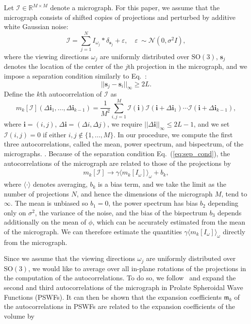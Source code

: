 \documentclass[english,11pt]{article}
\newcommand{\1}{\mathbf{1}}
\newcommand{\II}{\mathcal{I}}
\newcommand{\RR}{\mathbb{R}}
\newcommand{\mb}{\mathbf}
\newcommand{\TODO}[1]{{\color{red}{[#1]}}}
\numberwithin{equation}{section}
\theoremstyle{plain}
\theoremstyle{definition}
\theoremstyle{remark}
\theoremstyle{plain}
\theoremstyle{remark}
\theoremstyle{plain}
\theoremstyle{plain}
\newcommand{\be}{\begin{equation}}
\newcommand{\ee}{\end{equation}}
\begin{document}
Let $\II\in\RR^{M\times M}$ denote a micrograph. For this paper, we assume that the micrograph consists of shifted copies of projections and perturbed by additive white Gaussian noise:
\begin{equation}\label{eq:micrograph_model}
\II = \sum_{j=1}^{N} I_{\omega_j}\ast\delta_{\mb s_j}+ \varepsilon, \quad \varepsilon~\sim\mathcal{N}(0,\sigma^2 I),
\end{equation}
where the viewing directions $\omega_j$ are uniformly distributed over $\text{SO}(3)$, $\mb s_j$ denotes the location of the center of the $j$th projection in the micrograph, and we impose a separation condition similarly to Eq.~\TODO{2D}:
\be\label{eq:sep_cond} ||\mb s_j - \mb s_i||_{\infty} \geq 2L. \ee
\TODO{Say something about nonuniformity in practice? Remember that biologists will jump at this...}
Define the $k$th autocorrelation of $\II$ as
\be\label{eq:Kth_autocorrelation} 
m_k[\II](\Delta \mb i_1,\ldots, \Delta \mb i_{k-1}) = \frac{1}{M^2}\sum_{i,j = 1}^M\II(\mb i)\II(\mb i+\Delta\mb i_1)\cdots \II(\mb i+\Delta \mb i_{k-1}),
\ee
where $\mb i = (i,j)$, $\Delta \mb i = (\Delta i, \Delta j)$, we require $||\Delta\mb i||_{\infty}\leq 2L-1$, and we set $\II(i,j)=0$ if either $i,j\notin\{1,\ldots, M\}$. In our procedure, we compute the first three autocorrelations, called the mean, power spectrum, and bispectrum, of the micrographs. \TODO{This definition and terminology should come earlier}. Because of the separation condition Eq.~(\ref{eq:sep_cond}), the autocorrelations of the micrograph are related to those of the projections by 
\begin{align}
m_k[\II]  \to \gamma\langle m_k[I_\omega]\rangle_{\omega} + b_k, 
\end{align}
where $\langle\cdot\rangle$ denotes averaging, $b_k$ is a bias term, and we take the limit as the number of projections $N$, and hence the dimensions of the micrograph $M$, tend to $\infty$. The mean is unbiased so $b_1 = 0$, the power spectrum has bias $b_2$ depending only on $\sigma^2$, the variance of the noise, and the bias of the bispectrum $b_3$ depends additionally on the mean of $\phi$, which can be accurately estimated from the mean of the micrograph. We can therefore estimate the quantities $\gamma\langle m_k[I_{\omega}]\rangle_{\omega}$ directly from the micrograph.

Since we assume that the viewing directions $\omega_j$ are uniformly distributed over $\text{SO}(3)$, we would like to average over all in-plane rotations of the projections in the computation of the autocorrelations. To do so, we follow~\cite{landa2017steerable,zhao2016fast} and expand the second and third autocorrelations of the micrograph in Prolate Spheroidal Wave Functions (PSWFs). 
It can then be shown that the expansion coefficients $\mathfrak{m}_k$ of the autocorrelations in PSWFs are related to the expansion coefficients of the volume by
\end{document}
